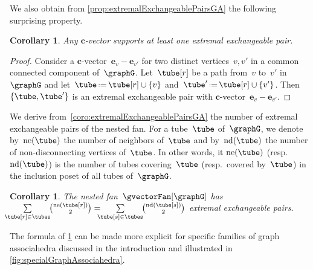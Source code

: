 \documentclass{amsart}
\newtheorem{corollary}[theorem]{Corollary}
\theoremstyle{definition}
\renewcommand{\b}[1]{{\boldsymbol{#1}}} %
\newcommand{\eqdef}{\mbox{\,\raisebox{0.2ex}{\scriptsize\ensuremath{\mathrm:}}\ensuremath{=}\,}} %
\newcommand{\nonDisconnecting}{\mathrm{nd}} %
\newcommand{\neighbors}{\mathrm{ne}} %
\begin{document}
We also obtain from \cref{prop:extremalExchangeablePairsGA} the following surprising property.

\begin{corollary}
Any $\b{c}$-vector supports at least one extremal exchangeable pair.
\end{corollary}

\begin{proof}
Consider a $\b{c}$-vector~$\b{e}_v - \b{e}_{v'}$ for two distinct vertices~$v, v'$ in a common connected component of~$\graphG$. Let~$\tube[r]$ be a path from~$v$ to~$v'$ in~$\graphG$ and let~$\tube \eqdef \tube[r] \cup \{v\}$ and~$\tube' \eqdef \tube[r] \cup \{v'\}$. Then $\{\tube, \tube'\}$ is an extremal exchangeable pair with $\b{c}$-vector~$\b{e}_v - \b{e}_{v'}$.
\end{proof}

We derive from~\cref{coro:extremalExchangeablePairsGA} the number of extremal exchangeable pairs of the nested fan.
For a tube~$\tube$ of~$\graphG$, we denote by~$\neighbors(\tube)$ the number of neighbors of~$\tube$ and by~$\nonDisconnecting(\tube)$ the number of non-disconnecting vertices of~$\tube$.
In other words, it $\neighbors(\tube)$ (resp.~$\nonDisconnecting(\tube)$) is the number of tubes covering~$\tube$ (resp.~covered by~$\tube$) in the inclusion poset of all tubes of~$\graphG$.

\begin{corollary}
\label{coro:numberExtremalExchangeablePairsGA}
The nested fan~$\gvectorFan[\graphG]$ has~$\!\!\!\! \sum\limits_{\tube[r] \in \tubes} \!\! \binom{\neighbors(\tube[r])}{2} = \!\!\!\! \sum\limits_{\tube[s] \in \tubes} \!\! \binom{\nonDisconnecting(\tube[s])}{2}$ extremal exchangeable pairs.
\end{corollary}


The formula of \cref{coro:numberExtremalExchangeablePairsGA} can be made more explicit for specific families of graph associahedra discussed in the introduction and illustrated in \cref{fig:specialGraphAssociahedra}.
\end{document}
